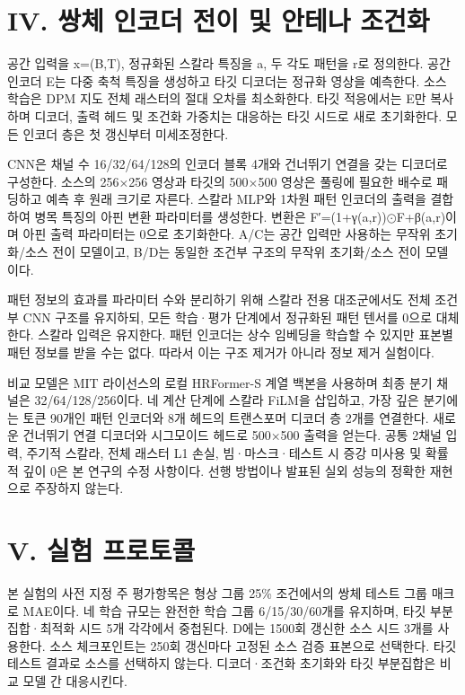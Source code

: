 \documentclass[10pt,a4paper]{article}
\begin{document}
\section*{IV. 쌍체 인코더 전이 및 안테나 조건화}
공간 입력을 x=(B,T), 정규화된 스칼라 특징을 a, 두 각도 패턴을 r로 정의한다. 공간 인코더 E는 다중 축척 특징을 생성하고 타깃 디코더는 정규화 영상을 예측한다. 소스 학습은 DPM 지도 전체 래스터의 절대 오차를 최소화한다. 타깃 적응에서는 E만 복사하며 디코더, 출력 헤드 및 조건화 가중치는 대응하는 타깃 시드로 새로 초기화한다. 모든 인코더 층은 첫 갱신부터 미세조정한다.

CNN은 채널 수 16/32/64/128의 인코더 블록 4개와 건너뛰기 연결을 갖는 디코더로 구성한다. 소스의 256×256 영상과 타깃의 500×500 영상은 풀링에 필요한 배수로 패딩하고 예측 후 원래 크기로 자른다. 스칼라 MLP와 1차원 패턴 인코더의 출력을 결합하여 병목 특징의 아핀 변환 파라미터를 생성한다. 변환은 F′=(1+γ(a,r))$\odot$F+β(a,r)이며 아핀 출력 파라미터는 0으로 초기화한다. A/C는 공간 입력만 사용하는 무작위 초기화/소스 전이 모델이고, B/D는 동일한 조건부 구조의 무작위 초기화/소스 전이 모델이다.

패턴 정보의 효과를 파라미터 수와 분리하기 위해 스칼라 전용 대조군에서도 전체 조건부 CNN 구조를 유지하되, 모든 학습·평가 단계에서 정규화된 패턴 텐서를 0으로 대체한다. 스칼라 입력은 유지한다. 패턴 인코더는 상수 임베딩을 학습할 수 있지만 표본별 패턴 정보를 받을 수는 없다. 따라서 이는 구조 제거가 아니라 정보 제거 실험이다.

비교 모델은 MIT 라이선스의 로컬 HRFormer-S 계열 백본을 사용하며 최종 분기 채널은 32/64/128/256이다. 네 계산 단계에 스칼라 FiLM을 삽입하고, 가장 깊은 분기에는 토큰 90개인 패턴 인코더와 8개 헤드의 트랜스포머 디코더 층 2개를 연결한다. 새로운 건너뛰기 연결 디코더와 시그모이드 헤드로 500×500 출력을 얻는다. 공통 2채널 입력, 주기적 스칼라, 전체 래스터 L1 손실, 빔·마스크·테스트 시 증강 미사용 및 확률적 깊이 0은 본 연구의 수정 사항이다. 선행 방법이나 발표된 실외 성능의 정확한 재현으로 주장하지 않는다.

\section*{V. 실험 프로토콜}
본 실험의 사전 지정 주 평가항목은 형상 그룹 25\% 조건에서의 쌍체 테스트 그룹 매크로 MAE이다. 네 학습 규모는 완전한 학습 그룹 6/15/30/60개를 유지하며, 타깃 부분집합·최적화 시드 5개 각각에서 중첩된다. D에는 1500회 갱신한 소스 시드 3개를 사용한다. 소스 체크포인트는 250회 갱신마다 고정된 소스 검증 표본으로 선택한다. 타깃 테스트 결과로 소스를 선택하지 않는다. 디코더·조건화 초기화와 타깃 부분집합은 비교 모델 간 대응시킨다.
\end{document}
